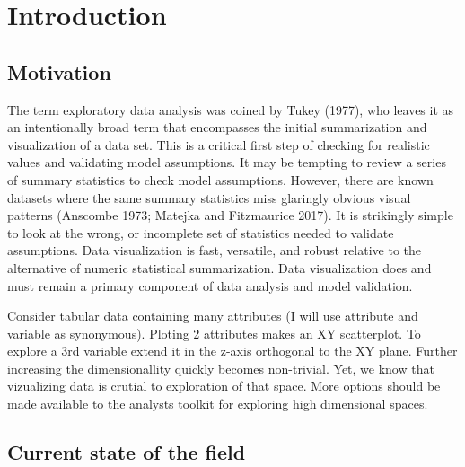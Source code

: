 \documentclass[
  11,
]{article}
\begin{document}
\newpage

% 

\doublespacing

\newpage
{}
\hypersetup{linkcolor = blue}

{
\hypersetup{linkcolor=}
\setcounter{tocdepth}{2}
\tableofcontents
}
\hypertarget{sec:intro}{%
\section{Introduction}\label{sec:intro}}

\hypertarget{motivation}{%
\subsection{Motivation}\label{motivation}}

The term exploratory data analysis was coined by Tukey (1977), who leaves it as an intentionally broad term that encompasses the initial summarization and visualization of a data set. This is a critical first step of checking for realistic values and validating model assumptions. It may be tempting to review a series of summary statistics to check model assumptions. However, there are known datasets where the same summary statistics miss glaringly obvious visual patterns (Anscombe 1973; Matejka and Fitzmaurice 2017). It is strikingly simple to look at the wrong, or incomplete set of statistics needed to validate assumptions. Data visualization is fast, versatile, and robust relative to the alternative of numeric statistical summarization. Data visualization does and must remain a primary component of data analysis and model validation.

Consider tabular data containing many attributes (I will use attribute and variable as synonymous). Ploting 2 attributes makes an XY scatterplot. To explore a 3rd variable extend it in the z-axis orthogonal to the XY plane. Further increasing the dimensionallity quickly becomes non-trivial. Yet, we know that vizualizing data is crutial to exploration of that space. More options should be made available to the analysts toolkit for exploring high dimensional spaces.

\hypertarget{current-state-of-the-field}{%
\subsection{Current state of the field}\label{current-state-of-the-field}}
\end{document}
